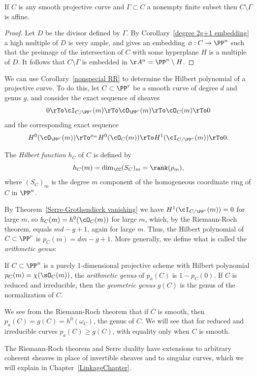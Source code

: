 \begin{corollary}
 If $C$ is any smooth projective curve and $\Gamma \subset C$ a nonempty finite subset then $C \setminus \Gamma$ is affine.
\end{corollary}
\begin{proof}
Let $D$ be the divisor defined by $\Gamma$. By Corollary~\ref{degree 2g+1 embedding} a high multiple of $D$ is very ample,
and gives an embedding $\phi: C\to \PP^n$ such that the preimage of the intersection of $C$ with some hyperplane $H$
is a multiple of $D$. It follows that $C\setminus \Gamma$ is embedded in $\AA^n = \PP^n\setminus H$.
\end{proof}
 
We can  use Corollary~\ref{nonspecial RR} to determine the Hilbert polynomial of a projective curve. To do this, let $C \subset \PP^r$ be a smooth curve of degree $d$ and genus $g$, and consider the exact sequence of sheaves
$$
0 \rTo \cI_{C/\PP^r}(m) \rTo \cO_{\PP^r}(m) \rTo \cO_C(m) \rTo 0
$$
and the corresponding exact sequence
$$
 H^0(\cO_{\PP^r}(m)) \rTo^{\rho_m} H^0(\cO_C(m)) \rTo H^1(\cI_{C/\PP^r}(m)) \rTo 0.
$$

The \emph{Hilbert function} $h_C$ of $C$  is defined by
$$
h_C(m) = \dim_{\CC} (S_{C})_{m} = \rank(\rho_m),
$$
where $(S_{C})_{m}$ is the degree $m$ component of the homogeneous coordinate ring of $C$ in $\PP^n$.

By Theorem~\ref{Serre-Grothendieck vanishing} we have $H^1(\cI_{C/\PP^r}(m)) = 0$ for large $m$, so $h_{C}(m) = h^0(\cO_C(m))$ for large $m$, which, by the Riemann-Roch theorem, equals $md-g+1$, again for large $m$. Thus, the Hilbert polynomial of $C \subset \PP^r$ is $p_C(m) = dm-g+1$. 
More generally, we define what is called the \emph{arithmetic genus}:

\begin{definition}\label{genus Hilbert}\label{pa}\label{genus formula}
If $C\subset \PP^n$ is a purely 1-dimensional projective scheme with Hilbert polynomial
$p_C(m) = \chi(\sO_C(m))$, the \emph{arithmetic genus} of $p_a(C)$ is $1-p_C(0)$. If $C$ is reduced and irreducible, then
the \emph{geometric genus} $g(C)$ is the genus of the normalization of $C$.
\end{definition}
We see from the Riemann-Roch theorem that if $C$ is smooth, then $p_a(C) = g(C) = h^0(\omega_C)$, the genus of $C$. We
will see that for reduced and irreducible curves $p_a(C) \geq g(C)$, with equality only when $C$ is smooth.
 
The Riemann-Roch theorem and Serre duality have extensions to arbitrary coherent sheaves in place of invertible sheaves 
and to singular curves, which we will explain in Chapter~\ref{LinkageChapter}.

